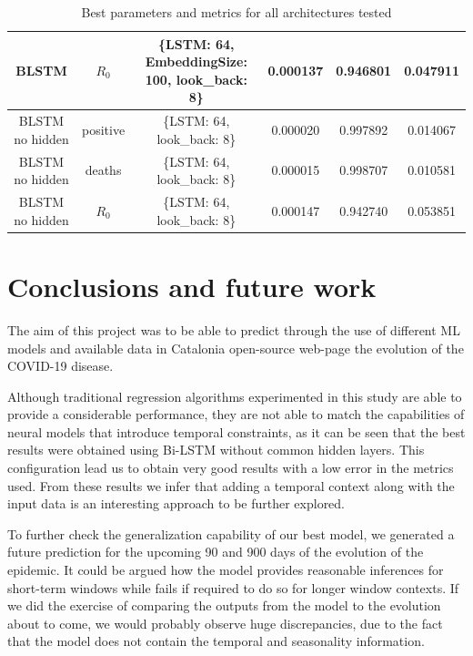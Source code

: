 \documentclass[anon]{CI}
\begin{document}
\begin{table}[t!]
{\begin{tabular}{|c|c|c|c|c|c|}
    BLSTM           & $R_0$     & \{LSTM: 64, EmbeddingSize: 100, look\_back: 8\}                    & 0.000137                & 0.946801                                 & 0.047911                      \\
    \hline
    BLSTM no hidden & positive & \{LSTM: 64, look\_back: 8\}                                        & 0.000020                & 0.997892                                 & 0.014067                      \\
    BLSTM no hidden & deaths   & \{LSTM: 64, look\_back: 8\}                                        & 0.000015                & 0.998707                                 & 0.010581                      \\
    BLSTM no hidden & $R_0$    & \{LSTM: 64, look\_back: 8\}                                        & 0.000147                & 0.942740                                 & 0.053851 \\ \hline
    \end{tabular}
}
\caption{\label{tab:Results}Best parameters and metrics for all architectures tested}
\end{table}

\section{Conclusions and future work}
\color{black}

The aim of this project was to be able to predict through the use of different ML models and available data in Catalonia open-source web-page the evolution of the COVID-19 disease.

Although traditional regression algorithms experimented in this study are able to provide a considerable performance, they are not able to match the capabilities of neural models that introduce temporal constraints, as it can be seen that the best results were obtained using Bi-LSTM without common hidden layers. This configuration lead us to obtain very good results with a low error in the metrics used. From these results we infer that adding a temporal context along with the input data is an interesting approach to be further explored.

To further check the generalization capability of our best model, we generated a future prediction for the upcoming 90 and 900 days of the evolution of the epidemic. It could be argued how the model provides reasonable inferences for short-term windows while fails if required to do so for longer window contexts. If we did the exercise of comparing the outputs from the model to the evolution about to come, we would probably observe huge discrepancies, due to the fact that the model does not contain the temporal and seasonality information.
\end{document}
